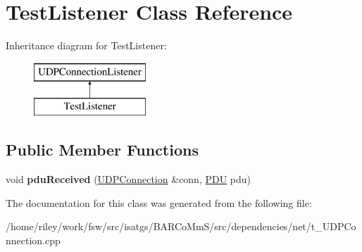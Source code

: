 \hypertarget{class_test_listener}{}\section{Test\+Listener Class Reference}
\label{class_test_listener}
Inheritance diagram for Test\+Listener\+:\begin{figure}[H]
\begin{center}
\leavevmode
\includegraphics[height=2.000000cm]{class_test_listener}
\end{center}
\end{figure}
\subsection*{Public Member Functions}
\begin{DoxyCompactItemize}
\item 
void {\bfseries pdu\+Received} (\hyperlink{class_u_d_p_connection}{U\+D\+P\+Connection} \&conn, \hyperlink{class_p_d_u}{P\+DU} pdu)\hypertarget{class_test_listener_a1914eec2124602730e9d0fa6b772f787}{}\label{class_test_listener_a1914eec2124602730e9d0fa6b772f787}

\end{DoxyCompactItemize}


The documentation for this class was generated from the following file\+:\begin{DoxyCompactItemize}
\item 
/home/riley/work/fsw/src/isatgs/\+B\+A\+R\+Co\+Mm\+S/src/dependencies/net/t\+\_\+\+U\+D\+P\+Connection.\+cpp\end{DoxyCompactItemize}
